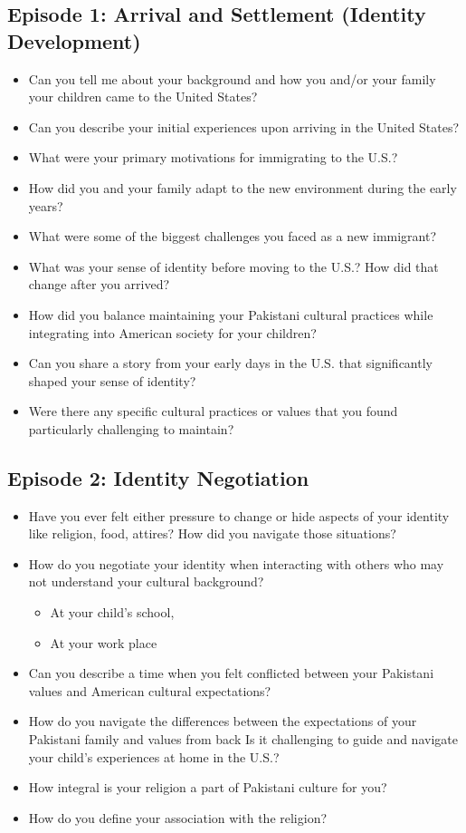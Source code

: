 \subsection{Episode 1: Arrival and Settlement (Identity Development)}

\begin{itemize}
    \item Can you tell me about your background and how you and/or your family your children came to the United States?
    \item Can you describe your initial experiences upon arriving in the United States?
    \item What were your primary motivations for immigrating to the U.S.?
    \item How did you and your family adapt to the new environment during the early years?
    \item What were some of the biggest challenges you faced as a new immigrant?
    \item What was your sense of identity before moving to the U.S.? How did that change after you arrived?
    \item How did you balance maintaining your Pakistani cultural practices while integrating into American society for your children?
    \item Can you share a story from your early days in the U.S. that significantly shaped your sense of identity?
    \item Were there any specific cultural practices or values that you found particularly challenging to maintain?
\end{itemize}

\subsection{Episode 2: Identity Negotiation}

\begin{itemize}
    \item Have you ever felt either pressure to change or hide aspects of your identity like religion, food, attires? How did you navigate those situations?
    \item How do you negotiate your identity when interacting with others who may not understand your cultural background?
    \begin{itemize}
        \item At your child’s school,
        \item At your work place
    \end{itemize}
    \item Can you describe a time when you felt conflicted between your Pakistani values and American cultural expectations?
    \item How do you navigate the differences between the expectations of your Pakistani family and values from back Is it challenging to guide and navigate your child's experiences at home in the U.S.?
    \item How integral is your religion a part of Pakistani culture for you?
    \item How do you define your association with the religion?
\end{itemize}

